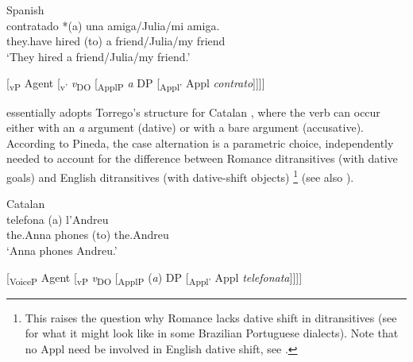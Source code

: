 \documentclass[output=paper,colorlinks,citecolor=brown,nonflat]{./langscibook}
\begin{document}
\ea%
    \label{ex:manzini:2}
    Spanish \citep{Torrego2010}\\
         {contratado}  {*(a)} {una} {amiga/Julia/mi} {amiga.}\\
        they.have   hired      (to) a friend/Julia/my friend\\
    \glt ‘They hired a friend/Julia/my friend.’
\z 

\ea%
    \label{ex:manzini:3}{}
    [\textsubscript{vP} Agent [\textsubscript{v’} \textit{v}\textsubscript{DO} [\textsubscript{ApplP} \textit{a} DP [\textsubscript{Appl’} Appl \textit{contrato}]]]]
\z

\citet[359-360]{Pineda2016} essentially adopts Torrego’s structure for Catalan , where the verb can occur either with an \textit{a} argument (dative) or with a bare argument (accusative). According to Pineda, the case alternation is a parametric choice, independently needed to account for the difference between Romance ditransitives (with dative goals) and English ditransitives (with dative-shift objects){} \footnote{This raises the question why Romance lacks dative shift in ditransitives (see \citet{Lima-Salles2016} for what it might look like in some Brazilian Portuguese dialects). Note that no Appl need be involved in English dative shift, see \citet{Kayne1984, Pesetsky1995, Harley2002, BeckJohnson2004}.} (see also \citealt{Pineda2014}).

\ea%
    \label{ex:manzini:4}
    Catalan \citep{Pineda2016}\\
       {telefona}   {(a)} {l’Andreu}\\
        the.Anna   phones   (to) the.Andreu\\
    \glt ‘Anna phones Andreu.’
\z

\ea%
    \label{ex:manzini:5}{}
    [\textsubscript{VoiceP}  Agent [\textsubscript{vP} \textit{v}\textsubscript{DO} [\textsubscript{ApplP} (\textit{a}) DP [\textsubscript{Appl’} Appl \textit{telefonata}]]]]\\
\z
\end{document}
